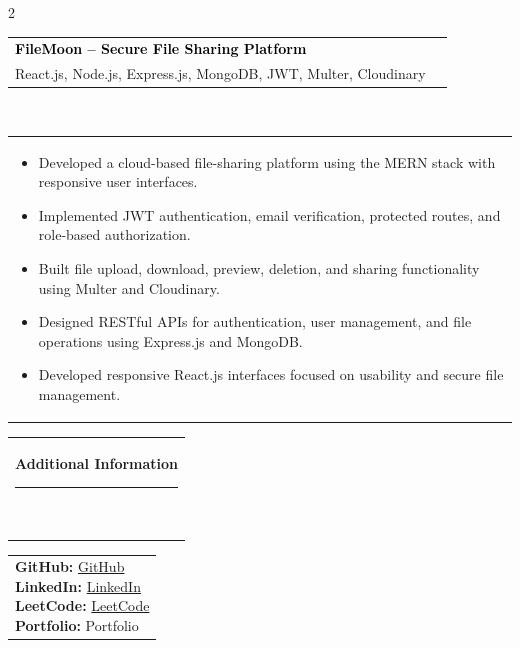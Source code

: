 \documentclass[10pt,A4,english]{article}
\newcommand{\mpwidth}{\linewidth-\fboxsep-\fboxsep}
\newcommand{\cvtext}[1]{\begin{tabular*}{1\mpwidth}{p{0.98\mpwidth}}\parbox{1\mpwidth}{#1}\end{tabular*}}
\newcommand{\cvsection}[1]{\vspace{10pt}\cvtext{\textbf{\LARGE{\textcolor{darkcol}{#1}}}\\[-4pt]\textcolor{accentcol}{\rule{0.2\textwidth}{1.5pt}}\\}}
\newcommand{\cvevent}[4]{
  \parbox{\mpwidth}{
    \begin{tabular*}{1\mpwidth}{p{0.66\mpwidth} r}
      \textcolor{black}{\textbf{#2}} &
      \colorbox{accentcol}{\makebox[0.32\mpwidth]{\textcolor{white}{\textbf{#1}}}}\\
      \textcolor{maincol}{#3}&\\
    \end{tabular*}\\[5pt]
    \cvtext{#4}
  }\vspace{8pt}
}
\begin{document}
\begin{paracol}{2}
\begin{rightcolumn}
\cvevent{2026}
{FileMoon -- Secure File Sharing Platform}
{React.js, Node.js, Express.js, MongoDB, JWT, Multer, Cloudinary}
{\begin{itemize}[leftmargin=*,itemsep=2pt,topsep=2pt]
\item Developed a cloud-based file-sharing platform using the MERN stack with responsive user interfaces.
\item Implemented JWT authentication, email verification, protected routes, and role-based authorization.
\item Built file upload, download, preview, deletion, and sharing functionality using Multer and Cloudinary.
\item Designed RESTful APIs for authentication, user management, and file operations using Express.js and MongoDB.
\item Developed responsive React.js interfaces focused on usability and secure file management.
\end{itemize}}

\cvsection{Additional Information}
\cvtext{
\textbf{GitHub:} \href{https://github.com/}{GitHub}\\
\textbf{LinkedIn:} \href{https://www.linkedin.com/}{LinkedIn}\\
\textbf{LeetCode:} \href{https://leetcode.com/}{LeetCode}\\
\textbf{Portfolio:} Portfolio
}

\end{rightcolumn}
\end{paracol}
\end{document}
